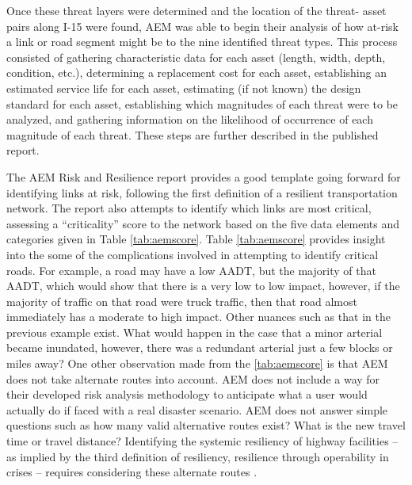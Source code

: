 Once these threat layers were determined and the location of the threat-
asset pairs along I-15
were found, AEM was able to begin their analysis of how at-risk a link or road
segment might be to the nine identified threat types. This process consisted of
gathering characteristic
data for each asset (length, width, depth, condition, etc.), determining a
replacement cost for
each asset, establishing an estimated service life for each asset,
estimating (if not known) the
design standard for each asset, establishing which magnitudes of each
threat were to be analyzed,
and gathering information on the likelihood of occurrence of each
magnitude of each threat. These
steps are further described in the published report.

The AEM Risk and Resilience report provides a good template going forward for identifying
links at risk,
following the first definition of a resilient transportation network. The
report also attempts to
identify which links are most critical, assessing a “criticality”
score to the network
based on the five data elements and categories given in Table \ref{tab:aemscore}.
Table \ref{tab:aemscore} provides insight into the some of the complications involved in
attempting to identify critical roads. For example, a road may have a low AADT, but
the majority of that AADT, which would show that there is a very low to low impact,
however, if the majority of traffic on that road were truck traffic, then that road almost
immediately has a moderate to high impact. Other nuances such as that in the previous
example exist. What would happen in the case that a minor arterial became inundated, however,
there was a redundant arterial just a few blocks or miles away? One other observation made from the
\ref{tab:aemscore} is that AEM does not take alternate routes into account.
AEM does not include a way for their developed risk analysis methodology
to anticipate what a user would actually do if faced with a real disaster
scenario. AEM does not answer simple questions such as how many valid
alternative routes exist? What is the new travel time or travel distance?
Identifying the systemic resiliency of highway facilities
– as implied by the third definition of resiliency, resilience through
operability in crises – requires considering these alternate routes \citep{aem2017}.

